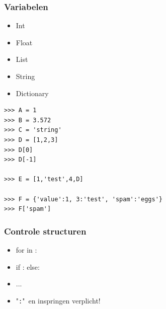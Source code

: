 \documentclass[t]{beamer}
\begin{document}
\begin{frame}[fragile]
	\frametitle{Variabelen}

	\begin{itemize}
		\item Int
		\item Float
		\item List
		\item String
		\item Dictionary
	\end{itemize}
	
	\begin{lstlisting}
>>> A = 1
>>> B = 3.572
>>> C = 'string'
>>> D = [1,2,3]
>>> D[0]
>>> D[-1]

>>> E = [1,'test',4,D]

>>> F = {'value':1, 3:'test', 'spam':'eggs'}
>>> F['spam']
	\end{lstlisting}
	
\end{frame}
\begin{frame}
	\frametitle{Controle structuren}
	
	\begin{itemize}
		\item for in :
		\item if : else:  
		\item ...
		\item "\lstinline{:}"\ en inspringen verplicht!
	\end{itemize}
	
	\vspace{1cm}
		
	
\end{frame}
\end{document}
